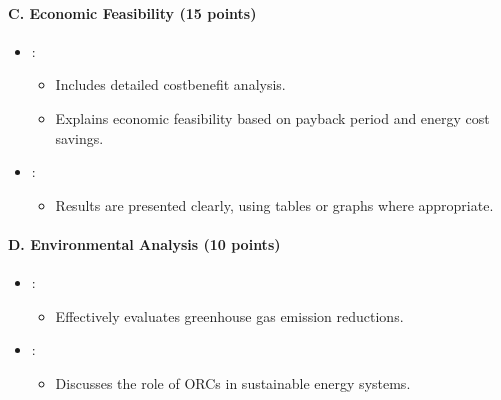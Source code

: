 \documentclass[letterpaper,10pt,english]{jupyterBook}
\begin{document}
\paragraph{C. Economic Feasibility (15 points)}
\label{\detokenize{ProjectInstructions:c-economic-feasibility-15-points}}\begin{itemize}
\item {} 
\sphinxAtStartPar
{}:
\begin{itemize}
\item {} 
\sphinxAtStartPar
Includes detailed cost\sphinxhyphen{}benefit analysis.

\item {} 
\sphinxAtStartPar
Explains economic feasibility based on payback period and energy
cost savings.

\end{itemize}

\item {} 
\sphinxAtStartPar
{}:
\begin{itemize}
\item {} 
\sphinxAtStartPar
Results are presented clearly, using tables or graphs where
appropriate.

\end{itemize}

\end{itemize}


\paragraph{D. Environmental Analysis (10 points)}
\label{\detokenize{ProjectInstructions:d-environmental-analysis-10-points}}\begin{itemize}
\item {} 
\sphinxAtStartPar
{}:
\begin{itemize}
\item {} 
\sphinxAtStartPar
Effectively evaluates greenhouse gas emission reductions.

\end{itemize}

\item {} 
\sphinxAtStartPar
{}:
\begin{itemize}
\item {} 
\sphinxAtStartPar
Discusses the role of ORCs in sustainable energy systems.

\end{itemize}

\end{itemize}
\end{document}
